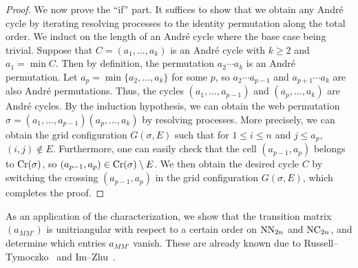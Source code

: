 \begin{proof}
  We now prove the ``if'' part. 
  It suffices to show that we obtain any Andr\'e cycle by iterating resolving
  processes to the identity permutation along the total order.
  We induct on the length of an Andr\'e cycle where the base case being trivial.
  Suppose that \( C=(a_1,\dots,a_k) \) is an Andr\'e cycle with \( k\ge 2 \) and
  \( a_1=\min C \). Then by definition, the permutation \( a_2\cdots a_k \) is
  an Andr\'e permutation. Let \( a_p = \min \{a_2,\dots,a_k\} \) for some
  \( p \), so \( a_2\cdots a_{p-1} \) and \( a_{p+1}\cdots a_k \) are also
  Andr\'e permutations. Thus, the cycles \( (a_1,\dots,a_{p-1}) \) and
  \( (a_p, \dots,a_k) \) are Andr\'e cycles.
  By the induction hypothesis, we can obtain the web permutation
  \( \sigma=(a_1,\dots,a_{p-1})(a_p,\dots,a_k) \) by resolving processes.
  More precisely, we can obtain the grid configuration \( G(\sigma, E) \)
  such that for \( 1\le i\le n \) and \( j\le a_p \), \( (i,j)\notin E \).
  Furthermore, one can easily check that the cell \( (a_{p-1}, a_p) \) belongs to
  \( \operatorname{Cr}(\sigma) \), so \( (a_{p-1}, a_p)\in\operatorname{Cr}(\sigma)\setminus E \).
  We then obtain the desired cycle \( C \) by switching the crossing
  \( (a_{p-1}, a_p) \) in the grid configuration \( G(\sigma, E) \),
  which completes the proof.
\end{proof}

As an application of the characterization, we show that the transition matrix
\( (a_{MM'}) \) is unitriangular with respect to a certain order on \( \operatorname{NN}_{2n} \)
and \( \operatorname{NC}_{2n} \), and determine which entries \( a_{MM'} \) vanish.
These are already known due to Russell--Tymoczko~\cite{RT19} and
Im--Zhu~\cite{IZ22}.

